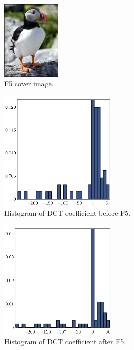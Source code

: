 \begin{figure}
	\centering
	\includegraphics[width=0.25\textwidth]{figures/puffin.jpg}
	\caption{F5 cover image.}
	\label{fig:puffin}
\end{figure}

\begin{figure}
	\centering
	\includegraphics[width=0.5\textwidth]{figures/inputF5.png}
	\caption{Histogram of DCT coefficient before F5.}
	\label{fig:InputF5}
\end{figure}

\begin{figure}
	\centering
	\includegraphics[width=0.5\textwidth]{figures/outputF5.png}
	\caption{Histogram of DCT coefficient after F5.}
	\label{fig:outputF5}
\end{figure}


